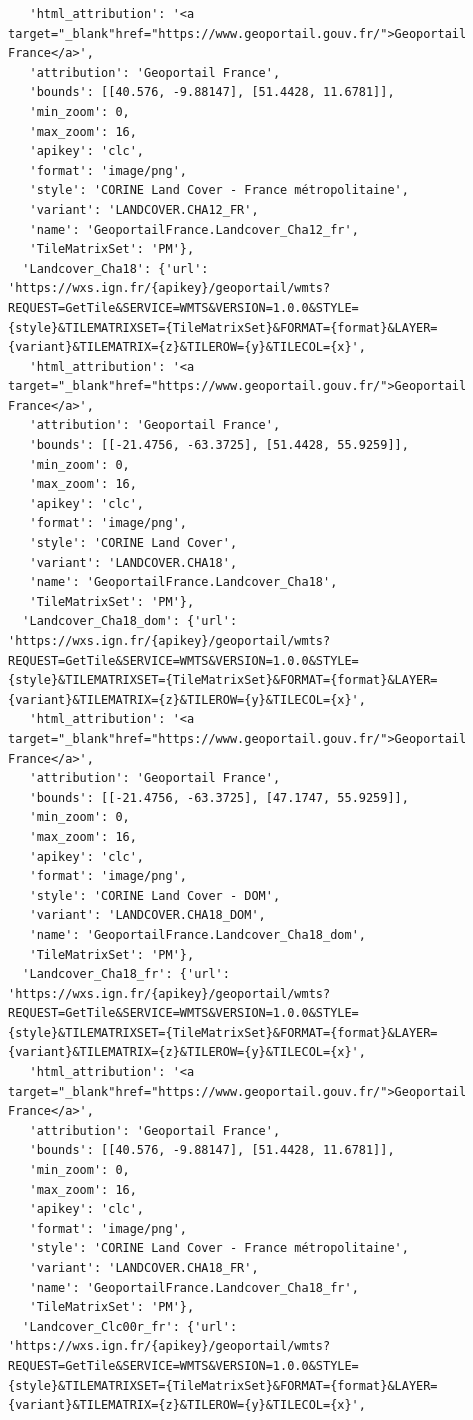 \documentclass[
  letterpaper,
  DIV=11,
  numbers=noendperiod]{scrreprt}
\begin{document}
\begin{verbatim}
   'html_attribution': '<a target="_blank"href="https://www.geoportail.gouv.fr/">Geoportail France</a>',
   'attribution': 'Geoportail France',
   'bounds': [[40.576, -9.88147], [51.4428, 11.6781]],
   'min_zoom': 0,
   'max_zoom': 16,
   'apikey': 'clc',
   'format': 'image/png',
   'style': 'CORINE Land Cover - France métropolitaine',
   'variant': 'LANDCOVER.CHA12_FR',
   'name': 'GeoportailFrance.Landcover_Cha12_fr',
   'TileMatrixSet': 'PM'},
  'Landcover_Cha18': {'url': 'https://wxs.ign.fr/{apikey}/geoportail/wmts?REQUEST=GetTile&SERVICE=WMTS&VERSION=1.0.0&STYLE={style}&TILEMATRIXSET={TileMatrixSet}&FORMAT={format}&LAYER={variant}&TILEMATRIX={z}&TILEROW={y}&TILECOL={x}',
   'html_attribution': '<a target="_blank"href="https://www.geoportail.gouv.fr/">Geoportail France</a>',
   'attribution': 'Geoportail France',
   'bounds': [[-21.4756, -63.3725], [51.4428, 55.9259]],
   'min_zoom': 0,
   'max_zoom': 16,
   'apikey': 'clc',
   'format': 'image/png',
   'style': 'CORINE Land Cover',
   'variant': 'LANDCOVER.CHA18',
   'name': 'GeoportailFrance.Landcover_Cha18',
   'TileMatrixSet': 'PM'},
  'Landcover_Cha18_dom': {'url': 'https://wxs.ign.fr/{apikey}/geoportail/wmts?REQUEST=GetTile&SERVICE=WMTS&VERSION=1.0.0&STYLE={style}&TILEMATRIXSET={TileMatrixSet}&FORMAT={format}&LAYER={variant}&TILEMATRIX={z}&TILEROW={y}&TILECOL={x}',
   'html_attribution': '<a target="_blank"href="https://www.geoportail.gouv.fr/">Geoportail France</a>',
   'attribution': 'Geoportail France',
   'bounds': [[-21.4756, -63.3725], [47.1747, 55.9259]],
   'min_zoom': 0,
   'max_zoom': 16,
   'apikey': 'clc',
   'format': 'image/png',
   'style': 'CORINE Land Cover - DOM',
   'variant': 'LANDCOVER.CHA18_DOM',
   'name': 'GeoportailFrance.Landcover_Cha18_dom',
   'TileMatrixSet': 'PM'},
  'Landcover_Cha18_fr': {'url': 'https://wxs.ign.fr/{apikey}/geoportail/wmts?REQUEST=GetTile&SERVICE=WMTS&VERSION=1.0.0&STYLE={style}&TILEMATRIXSET={TileMatrixSet}&FORMAT={format}&LAYER={variant}&TILEMATRIX={z}&TILEROW={y}&TILECOL={x}',
   'html_attribution': '<a target="_blank"href="https://www.geoportail.gouv.fr/">Geoportail France</a>',
   'attribution': 'Geoportail France',
   'bounds': [[40.576, -9.88147], [51.4428, 11.6781]],
   'min_zoom': 0,
   'max_zoom': 16,
   'apikey': 'clc',
   'format': 'image/png',
   'style': 'CORINE Land Cover - France métropolitaine',
   'variant': 'LANDCOVER.CHA18_FR',
   'name': 'GeoportailFrance.Landcover_Cha18_fr',
   'TileMatrixSet': 'PM'},
  'Landcover_Clc00r_fr': {'url': 'https://wxs.ign.fr/{apikey}/geoportail/wmts?REQUEST=GetTile&SERVICE=WMTS&VERSION=1.0.0&STYLE={style}&TILEMATRIXSET={TileMatrixSet}&FORMAT={format}&LAYER={variant}&TILEMATRIX={z}&TILEROW={y}&TILECOL={x}',

\end{verbatim}
\end{document}
